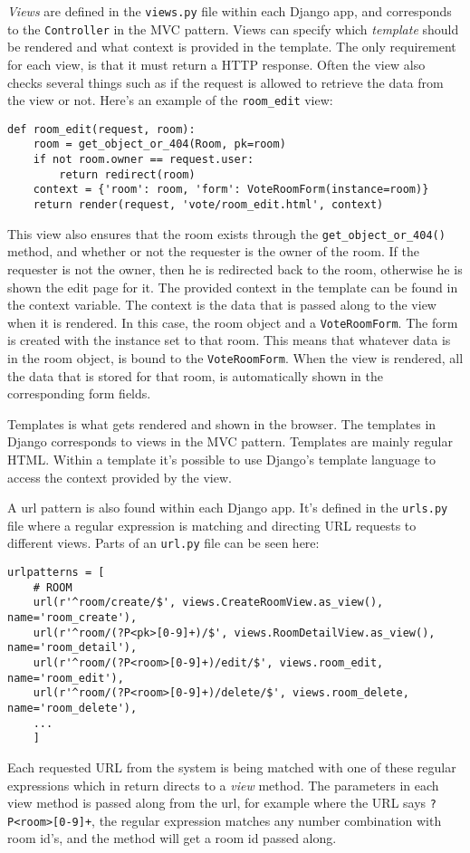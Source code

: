 \emph{Views} are defined in the \texttt{views.py} file within each Django app, and corresponds to the \texttt{Controller} in the MVC pattern. Views can specify which \emph{template} should be rendered and what context is provided in the template. The only requirement for each view, is that it must return a HTTP response. Often the view also checks several things such as if the request is allowed to retrieve the data from the view or not. Here's an example of the \texttt{room\_edit} view:

\begin{lstlisting}[caption=The Room edit method, label=lst:room-edit-method]
def room_edit(request, room):
    room = get_object_or_404(Room, pk=room)
    if not room.owner == request.user:
        return redirect(room)
    context = {'room': room, 'form': VoteRoomForm(instance=room)}
    return render(request, 'vote/room_edit.html', context)
\end{lstlisting}
This view also ensures that the room exists through the \texttt{get\_object\_or\_404()} method, and whether or not the requester is the owner of the room. If the requester is not the owner, then he is redirected back to the room, otherwise he is shown the edit page for it. The provided context in the template can be found in the context variable. The context is the data that is passed along to the view when it is rendered. In this case, the room object and a \texttt{VoteRoomForm}. The form is created with the instance set to that room. This means that whatever data is in the room object, is bound to the \texttt{VoteRoomForm}. When the view is rendered, all the data that is stored for that room, is automatically shown in the corresponding form fields. 

Templates is what gets rendered and shown in the browser. The templates in Django corresponds to views in the MVC pattern. Templates are mainly regular HTML. Within a template it's possible to use Django's template language to access the context provided by the view.

A url pattern is also found within each Django app. It's defined in the \texttt{urls.py} file where a regular expression is matching and directing URL requests to different views. Parts of an \texttt{url.py} file can be seen here:

\begin{lstlisting}[caption=URL Patterns from the vote app, label=lst:urlpatterns]
urlpatterns = [
    # ROOM
    url(r'^room/create/$', views.CreateRoomView.as_view(), name='room_create'),
    url(r'^room/(?P<pk>[0-9]+)/$', views.RoomDetailView.as_view(), name='room_detail'),
    url(r'^room/(?P<room>[0-9]+)/edit/$', views.room_edit, name='room_edit'),
    url(r'^room/(?P<room>[0-9]+)/delete/$', views.room_delete, name='room_delete'),
    ...
    ]
\end{lstlisting}
Each requested URL from the system is being matched with one of these regular expressions which in return directs to a \emph{view} method. The parameters in each view method is passed along from the url, for example where the URL says \texttt{?P<room>[0-9]+}, the regular expression matches any number combination with room id's, and the method will get a room id passed along.

